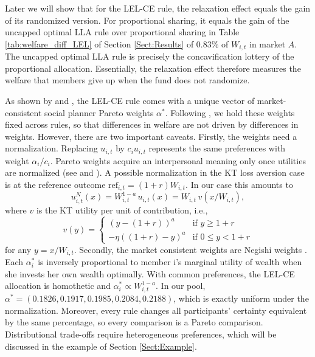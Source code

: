 Later we will show that for the LEL-CE rule, the relaxation effect equals the gain of its randomized version. For proportional sharing, it equals the gain of the uncapped optimal LLA rule over proportional sharing in Table \ref{tab:welfare_diff_LEL} of Section \ref{Sect:Results} of 0.83\% of $W_{i,t}$ in market $A$. The uncapped optimal LLA rule is precisely the concavification lottery of the proportional allocation. Essentially, the relaxation effect therefore measures the welfare that members give up when the fund does not randomize.

As shown by \citet{Pazderaetal2017} and \citet{NgNguyen2025}, the LEL-CE rule comes with a unique vector of market-consistent social planner Pareto weights $\alpha^*$. Following \citet{DavilaSchaab2025}, we hold these weights fixed across rules, so that differences in welfare are not driven by differences in weights. However, there are two important caveats. Firstly, the weights need a normalization. Replacing $u_{i,t}$ by $c_i u_{i,t}$ represents the same preferences with weight $\alpha_i/c_i$. Pareto weights acquire an interpersonal meaning only once utilities are normalized (see \citet{Harsanyi1955} and \citet{dAspremontGevers1977}). A possible normalization in the KT loss aversion case is at the reference outcome $\text{ref}_{i,t} = (1+r) W_{i,t}$. In our case this amounts to
\begin{equation}
    u^N_{i,t}(x)=W_{i,t}^{1-a}\,u_{i,t}(x)=W_{i,t}\,v(x/W_{i,t}),
\end{equation}
where $v$ is the KT utility per unit of contribution, i.e., 
\begin{equation}
    \label{eq:Loss_Averion_Per_Unit_Contribution}
    v(y) = \begin{cases} (y - (1+r))^a & \text{if } y \ge 1+r \\ -\eta ((1+r) - y)^a & \text{if } 0 \le y < 1+r \end{cases}
\end{equation}
for any $y = x/W_{i,t}$. Secondly, the market consistent weights are Negishi weights \citep{Negishi1960}. Each $\alpha_i^*$ is inversely proportional to member i's marginal utility of wealth when she invests her own wealth optimally. With common preferences, the LEL-CE allocation is homothetic and $\alpha_i^* \propto W_{i,t}^{1-a}$. In our pool, $\alpha^* = (0.1826, 0.1917, 0.1985, 0.2084, 0.2188)$, which is exactly uniform under the normalization. Moreover, every rule changes all participants' certainty equivalent by the same percentage, so every comparison is a Pareto comparison. Distributional trade-offs require heterogeneous preferences, which will be discussed in the example of Section \ref{Sect:Example}.

